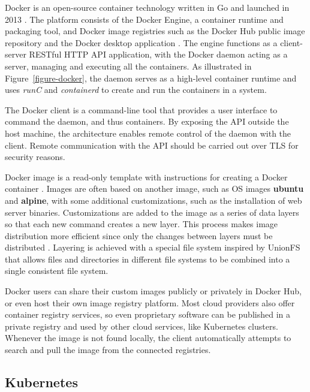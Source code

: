 \documentclass[english, 12pt, a4paper, sci, utf8, a-2b, online]{aaltothesis}
\begin{document}
Docker is an open-source container technology written in Go and launched in 2013 \cite{docker-what}.
The platform consists of the Docker Engine, a container runtime and packaging tool, and Docker image registries such as the Docker Hub public image repository and the Docker desktop application \cite{docker-overview}.
The engine functions as a client-server RESTful HTTP API application, with the Docker daemon acting as a server, managing and executing all the containers.
As illustrated in Figure~\ref{figure-docker}, the daemon serves as a high-level container runtime and uses \emph{runC} and \emph{containerd} to create and run the containers in a system.

The Docker client is a command-line tool that provides a user interface to command the daemon, and thus containers.
By exposing the API outside the host machine, the architecture enables remote control of the daemon with the client.
Remote communication with the API should be carried out over TLS for security reasons.

Docker image is a read-only template with instructions for creating a Docker container \cite{docker-overview}.
Images are often based on another image, such as OS images \textbf{ubuntu} and \textbf{alpine}, with some additional customizations, such as the installation of web server binaries.
Customizations are added to the image as a series of data layers so that each new command creates a new layer.
This process makes image distribution more efficient since only the changes between layers must be distributed \cite{bui2015analysis}.
Layering is achieved with a special file system inspired by UnionFS that allows files and directories in different file systems to be combined into a single consistent file system.

Docker users can share their custom images publicly or privately in Docker Hub, or even host their own image registry platform.
Most cloud providers also offer container registry services, so even proprietary software can be published in a private registry and used by other cloud services, like Kubernetes clusters.
Whenever the image is not found locally, the client automatically attempts to search and pull the image from the connected registries.

\subsection{Kubernetes}
\end{document}
